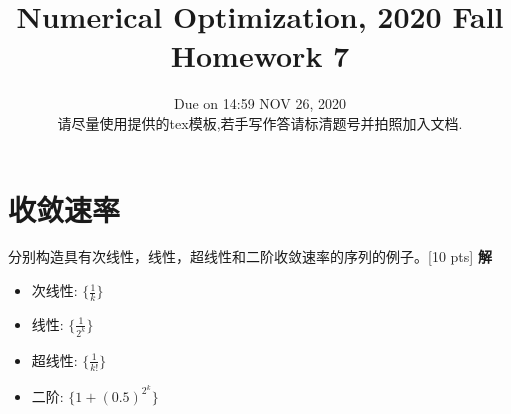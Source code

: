 \documentclass[10pt]{article}
\begin{document}
	
\title{	Numerical Optimization, 2020 Fall\\Homework 7}
\date{Due on 14:59 NOV 26, 2020\\
	请尽量使用提供的tex模板,若手写作答请标清题号并拍照加入文档.
	}
\maketitle

\section{收敛速率}
分别构造具有次线性，线性，超线性和二阶收敛速率的序列的例子。{\color{red}[10 pts]}
\textbf{解}
\begin{itemize}
	\item 次线性: $\{\frac{1}{k}\}$ 
	\item 线性: $\{ \frac{1}{2^k} \}$
	\item 超线性: $\{ \frac{1}{k!}\}$
	\item 二阶: $\{1+(0.5)^{2^k}\}$
\end{itemize}
\end{document}
